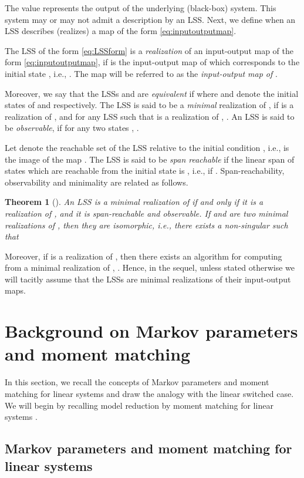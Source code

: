 \documentclass[journal]{IEEEtran}
\newtheorem{Theorem}{Theorem}
\begin{document}
The value  represents the output of the underlying (black-box) system. This system may or may not admit a description by an LSS. Next, we define when an LSS describes (realizes) a map of the form \eqref{eq:inputoutputmap}.

The LSS  of the form \eqref{eq:LSSform} is a \emph{realization} of an input-output map  of the form \eqref{eq:inputoutputmap}, if  is the input-output map of  which corresponds to the initial state , i.e., . The map  will be referred to as the \emph{input-output map of} .

Moreover, we say that the LSSs  and  are \emph{equivalent} if  where  and  denote the initial states of  and  respectively. The LSS  is said to be a \emph{minimal} realization of , if  is a realization of , and for any LSS  such that  is a realization of , . An LSS  is said to be \emph{observable}, if for any two states , .

Let  denote the reachable set of the LSS  relative to the initial condition , i.e.,  is the image of the map . The LSS  is said to be \emph{span reachable} if the linear span of states which are reachable from the initial state is , i.e., if . Span-reachability, observability and minimality are related as follows.
\begin{Theorem}[\cite{MP:BigArticlePartI}]
	An LSS  is a minimal realization of  if and only if it is a realization of , and it is span-reachable and observable. If  and  are two minimal realizations of , then they are \emph{isomorphic}, i.e., there exists a non-singular  such that
	
\end{Theorem}
Moreover, if  is a realization of , then there exists an algorithm for computing from  a minimal realization  of , \cite{MP:BigArticlePartI,petreczky2013}. Hence, in the sequel, unless stated otherwise we will tacitly assume that the LSSs are minimal realizations of their input-output maps.

\section{Background on Markov parameters and moment matching}
\label{sect:markov}

In this section, we recall the concepts of Markov parameters and moment matching for linear systems and draw the analogy with the linear switched case. We will begin by recalling model reduction by moment matching for linear systems \cite{antoulas}.

\subsection{Markov parameters and moment matching for linear systems}
\end{document}
